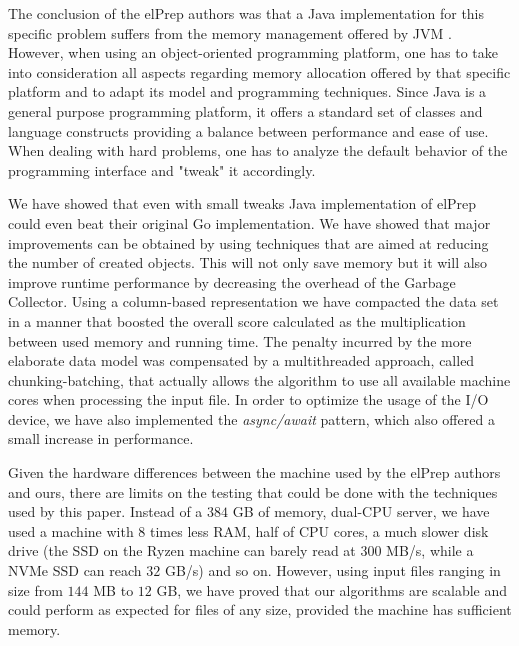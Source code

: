 \documentclass[a4paper,twoside]{article}
\begin{document}
The conclusion of the elPrep authors was that a Java implementation for this specific problem suffers from the memory management offered by JVM \cite{costanza:2019}.
However, when using an object-oriented programming platform, one has to take into consideration all aspects regarding memory allocation offered by that specific platform and to adapt its model and programming techniques.
Since Java is a general purpose programming platform, it offers a standard set of classes and language constructs providing a balance between performance and ease of use.
When dealing with hard problems, one has to analyze the default behavior of the programming interface and "tweak" it accordingly.

We have showed that even with small tweaks Java implementation of elPrep could even beat their original Go implementation.
We have showed that major improvements can be obtained by using techniques that are aimed at reducing the number of created objects.
This will not only save memory but it will also improve runtime performance by decreasing the overhead of the Garbage Collector.
Using a column-based representation we have compacted the data set in a manner that boosted the overall score calculated as the multiplication between used memory and running time.
The penalty incurred by the more elaborate data model was compensated by a multithreaded approach, called chunking-batching, that actually allows the algorithm to use all available machine cores when processing the input file.
In order to optimize the usage of the I/O device, we have also implemented the {\textit{async/await} } pattern, which also offered a small increase in performance.

Given the hardware differences between the machine used by the elPrep authors and ours, there are limits on the testing that could be done with the techniques used by this paper.
Instead of a $384$ GB of memory, dual-CPU server, we have used a machine  with $8$ times less RAM, half of CPU cores, a much slower disk drive (the SSD on the Ryzen machine can barely read at 300 MB/s, while a NVMe SSD can reach $32$ GB/s) and so on.
However, using input files ranging in size from $144$ MB to $12$ GB, we have proved that our algorithms are scalable and could perform as expected for files of any size, provided the machine has sufficient memory.






{\small
}
\end{document}

